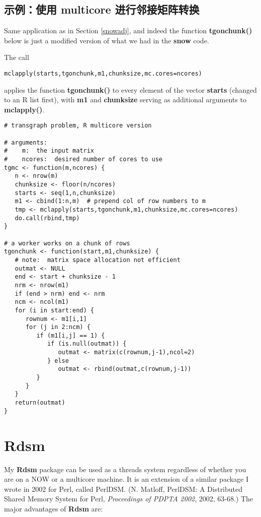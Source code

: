 \subsection{示例：使用 multicore 进行邻接矩阵转换}

Same application as in Section \ref{snowadj}, and indeed the function
{\bf tgonchunk()} below is just a modified version of what we had in the
{\bf snow} code.

The call

\begin{lstlisting}
mclapply(starts,tgonchunk,m1,chunksize,mc.cores=ncores)
\end{lstlisting}

applies the function {\bf tgonchunk()} to every element of the vector
{\bf starts} (changed to an R list first), with {\bf m1} and {\bf
chunksize} serving as additional arguments to {\bf mclapply()}.

\begin{lstlisting}
# transgraph problem, R multicore version

# arguments:
#    m:  the input matrix
#    ncores:  desired number of cores to use
tgmc <- function(m,ncores) {
   n <- nrow(m)
   chunksize <- floor(n/ncores)
   starts <- seq(1,n,chunksize)
   m1 <- cbind(1:n,m)  # prepend col of row numbers to m
   tmp <- mclapply(starts,tgonchunk,m1,chunksize,mc.cores=ncores)
   do.call(rbind,tmp)
}

# a worker works on a chunk of rows
tgonchunk <- function(start,m1,chunksize) {
   # note:  matrix space allocation not efficient
   outmat <- NULL
   end <- start + chunksize - 1
   nrm <- nrow(m1)
   if (end > nrm) end <- nrm
   ncm <- ncol(m1)
   for (i in start:end) {
      rownum <- m1[i,1]
      for (j in 2:ncm) {
         if (m1[i,j] == 1) {
            if (is.null(outmat)) {
               outmat <- matrix(c(rownum,j-1),ncol=2)
            } else
               outmat <- rbind(outmat,c(rownum,j-1))
         }
      }
   }
   return(outmat)
}
\end{lstlisting}


\section{Rdsm}

My {\bf Rdsm} package can be used as a threads system regardless of
whether you are on a NOW or a multicore machine.  It is an extension of
a similar package I wrote in 2002 for Perl, called PerlDSM.  (N.
Matloff, PerlDSM: A Distributed Shared Memory System for Perl, {\it
Proceedings of PDPTA 2002}, 2002, 63-68.)  The major advantages of {\bf
Rdsm} are:

